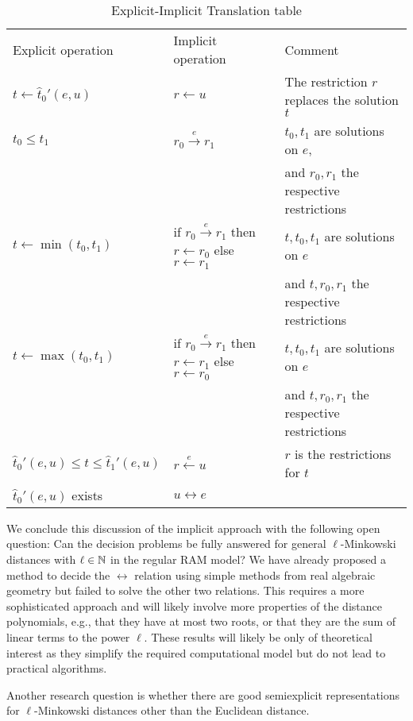 \begin{table}[htb]
  \centering
	\begin{tabular}{|lll|}
		\hline
		Explicit operation & Implicit operation & Comment\\
		\(t \gets \hat t_0'(e, u)\) & \(r \gets u\) & The restriction \(r\) replaces the solution \(t\)\\
		\(t_0 \leq t_1\) & \(r_0 \overset e\rightarrow r_1\) & \(t_0, t_1\) are solutions on \(e\), \\
		& & and \(r_0, r_1\) the respective restrictions\\
		\(t \gets \min(t_0, t_1)\) & if \(r_0 \overset{e}\rightarrow r_1\) then \(r \gets r_0\) else \(r \gets r_1\) & \(t, t_0, t_1\) are solutions on \(e\) \\
		& & and \(t, r_0, r_1\) the respective restrictions\\
		\(t \gets \max(t_0, t_1)\) & if \(r_0 \overset{e}\rightarrow r_1\) then \(r \gets r_1\) else \(r \gets r_0\) & \(t, t_0, t_1\) are solutions on \(e\) \\
		& & and \(t, r_0, r_1\) the respective restrictions\\
		\(\hat t_0'(e, u) \leq t \leq \hat t_1'(e, u)\) & \(r \overset e\leftarrow u\) & \(r\) is the restrictions for \(t\)\\
		\(\hat t_0'(e, u)\) exists & \(u \leftrightarrow e\) & \\
		\hline
	\end{tabular}
	\caption{Explicit-Implicit Translation table}
	\label{tab:explicit-implicit-translation}
\end{table}

We conclude this discussion of the implicit approach with the following open question: Can the decision problems be fully answered for general \(\ell\)-Minkowski distances with \(\ell \in \mathbb{N}\) in the regular RAM model? We have already proposed a method to decide the \(\leftrightarrow\) relation using simple methods from real algebraic geometry but failed to solve the other two relations. This requires a more sophisticated approach and will likely involve more properties of the distance polynomials, e.g., that they have at most two roots, or that they are the sum of linear terms to the power \(\ell\). These results will likely be only of theoretical interest as they simplify the required computational model but do not lead to practical algorithms. 

Another research question is whether there are good semiexplicit representations for \(\ell\)-Minkowski distances other than the Euclidean distance.

